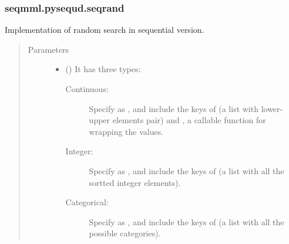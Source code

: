 \documentclass[letterpaper,10pt,english]{sphinxmanual}
\begin{document}
\subsubsection{seqmml.pysequd.seqrand}
\label{\detokenize{apidoc:module-pysequd.seqrand}}\label{\detokenize{apidoc:seqmml-pysequd-seqrand}}

\begin{fulllineitems}
\label{\detokenize{apidoc:pysequd.seqrand.SeqRand}}
Implementation of random search in sequential version.
\begin{quote}\begin{description}
\item[{Parameters}] \leavevmode\begin{itemize}
\item {} 
 () \textendash{} 
It has three types:
\begin{description}
\item[{Continuous: }] \leavevmode
Specify  as , and include the keys of  (a list with lower-upper elements pair) and
, a callable function for wrapping the values.

\item[{Integer:}] \leavevmode
Specify  as , and include the keys of  (a list with all the sortted integer elements).

\item[{Categorical:}] \leavevmode
Specify  as , and include the keys of  (a list with all the possible categories).

\end{description}



\end{itemize}
\end{description}
\end{quote}
\end{fulllineitems}
\end{document}
